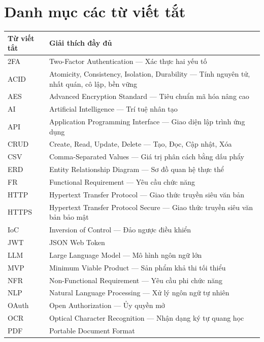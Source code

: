 \chapter*{Danh mục các từ viết tắt}

\begin{tabularx}{\textwidth}{|l|X|}
\hline
\textbf{Từ viết tắt} & \textbf{Giải thích đầy đủ} \\ \hline
2FA & Two-Factor Authentication --- Xác thực hai yếu tố \\ \hline
ACID & Atomicity, Consistency, Isolation, Durability --- Tính nguyên tử, nhất quán, cô lập, bền vững \\ \hline
AES & Advanced Encryption Standard --- Tiêu chuẩn mã hóa nâng cao \\ \hline
AI & Artificial Intelligence --- Trí tuệ nhân tạo \\ \hline
API & Application Programming Interface --- Giao diện lập trình ứng dụng \\ \hline
CRUD & Create, Read, Update, Delete --- Tạo, Đọc, Cập nhật, Xóa \\ \hline
CSV & Comma-Separated Values --- Giá trị phân cách bằng dấu phẩy \\ \hline
ERD & Entity Relationship Diagram --- Sơ đồ quan hệ thực thể \\ \hline
FR & Functional Requirement --- Yêu cầu chức năng \\ \hline
HTTP & Hypertext Transfer Protocol --- Giao thức truyền siêu văn bản \\ \hline
HTTPS & Hypertext Transfer Protocol Secure --- Giao thức truyền siêu văn bản bảo mật \\ \hline
IoC & Inversion of Control --- Đảo ngược điều khiển \\ \hline
JWT & JSON Web Token \\ \hline
LLM & Large Language Model --- Mô hình ngôn ngữ lớn \\ \hline
MVP & Minimum Viable Product --- Sản phẩm khả thi tối thiểu \\ \hline
NFR & Non-Functional Requirement --- Yêu cầu phi chức năng \\ \hline
NLP & Natural Language Processing --- Xử lý ngôn ngữ tự nhiên \\ \hline
OAuth & Open Authorization --- Ủy quyền mở \\ \hline
OCR & Optical Character Recognition --- Nhận dạng ký tự quang học \\ \hline
PDF & Portable Document Format \\ \hline

\end{tabularx}
